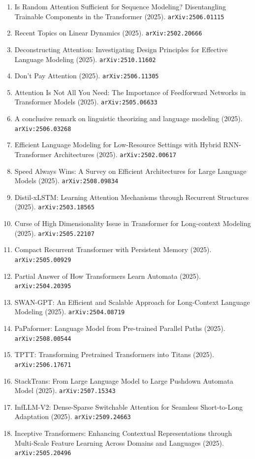 \documentclass[11pt]{article}
\begin{document}
\begin{enumerate}
  \item Is Random Attention Sufficient for Sequence Modeling? Disentangling Trainable Components in the Transformer (2025). \texttt{arXiv:2506.01115}
  \item Recent Topics on Linear Dynamics (2025). \texttt{arXiv:2502.20666}
  \item Deconstructing Attention: Investigating Design Principles for Effective Language Modeling (2025). \texttt{arXiv:2510.11602}
  \item Don't Pay Attention (2025). \texttt{arXiv:2506.11305}
  \item Attention Is Not All You Need: The Importance of Feedforward Networks in Transformer Models (2025). \texttt{arXiv:2505.06633}
  \item A conclusive remark on linguistic theorizing and language modeling (2025). \texttt{arXiv:2506.03268}
  \item Efficient Language Modeling for Low-Resource Settings with Hybrid
  RNN-Transformer Architectures (2025). \texttt{arXiv:2502.00617}
  \item Speed Always Wins: A Survey on Efficient Architectures for Large Language Models (2025). \texttt{arXiv:2508.09834}
  \item Distil-xLSTM: Learning Attention Mechanisms through Recurrent Structures (2025). \texttt{arXiv:2503.18565}
  \item Curse of High Dimensionality Issue in Transformer for Long-context Modeling (2025). \texttt{arXiv:2505.22107}
  \item Compact Recurrent Transformer with Persistent Memory (2025). \texttt{arXiv:2505.00929}
  \item Partial Answer of How Transformers Learn Automata (2025). \texttt{arXiv:2504.20395}
  \item SWAN-GPT: An Efficient and Scalable Approach for Long-Context Language
  Modeling (2025). \texttt{arXiv:2504.08719}
  \item PaPaformer: Language Model from Pre-trained Parallel Paths (2025). \texttt{arXiv:2508.00544}
  \item TPTT: Transforming Pretrained Transformers into Titans (2025). \texttt{arXiv:2506.17671}
  \item StackTrans: From Large Language Model to Large Pushdown Automata Model (2025). \texttt{arXiv:2507.15343}
  \item InfLLM-V2: Dense-Sparse Switchable Attention for Seamless Short-to-Long Adaptation (2025). \texttt{arXiv:2509.24663}
  \item Inceptive Transformers: Enhancing Contextual Representations through Multi-Scale Feature Learning Across Domains and Languages (2025). \texttt{arXiv:2505.20496}

\end{enumerate}
\end{document}
